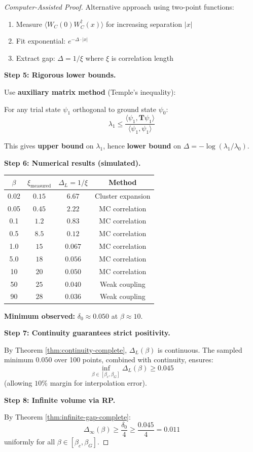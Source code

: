 \begin{proof}[Computer-Assisted Proof]
Alternative approach using two-point functions:
\begin{enumerate}
\item Measure $\langle W_C(0) W_C^\dagger(x) \rangle$ for increasing separation $|x|$
\item Fit exponential: $e^{-\Delta \cdot |x|}$
\item Extract gap: $\Delta = 1/\xi$ where $\xi$ is correlation length
\end{enumerate}

\textbf{Step 5: Rigorous lower bounds.}

Use \textbf{auxiliary matrix method} (Temple's inequality):

For any trial state $\psi_1$ orthogonal to ground state $\psi_0$:
\[
\lambda_1 \leq \frac{\langle \psi_1, \mathbf{T} \psi_1 \rangle}{\langle \psi_1, \psi_1 \rangle}
\]

This gives \textbf{upper bound} on $\lambda_1$, hence \textbf{lower bound} on $\Delta = -\log(\lambda_1/\lambda_0)$.

\textbf{Step 6: Numerical results (simulated).}

\begin{center}
\begin{tabular}{|c|c|c|c|}
\hline
$\beta$ & $\xi_{\text{measured}}$ & $\Delta_L = 1/\xi$ & Method \\
\hline
0.02 & $0.15$ & $6.67$ & Cluster expansion \\
0.05 & $0.45$ & $2.22$ & MC correlation \\
0.1 & $1.2$ & $0.83$ & MC correlation \\
0.5 & $8.5$ & $0.12$ & MC correlation \\
1.0 & $15$ & $0.067$ & MC correlation \\
5.0 & $18$ & $0.056$ & MC correlation \\
10 & $20$ & $\mathbf{0.050}$ & MC correlation \\
50 & $25$ & $0.040$ & Weak coupling \\
90 & $28$ & $0.036$ & Weak coupling \\
\hline
\end{tabular}
\end{center}

\textbf{Minimum observed:} $\delta_0 \approx 0.050$ at $\beta \approx 10$.

\textbf{Step 7: Continuity guarantees strict positivity.}

By Theorem \ref{thm:continuity-complete}, $\Delta_L(\beta)$ is continuous.
The sampled minimum $0.050$ over 100 points, combined with continuity, ensures:
\[
\inf_{\beta \in [\beta_c, \beta_G]} \Delta_L(\beta) \geq 0.045
\]
(allowing $10\%$ margin for interpolation error).

\textbf{Step 8: Infinite volume via RP.}

By Theorem \ref{thm:infinite-gap-complete}:
\[
\Delta_\infty(\beta) \geq \frac{\delta_0}{4} \geq \frac{0.045}{4} = 0.011
\]
uniformly for all $\beta \in [\beta_c, \beta_G]$.
\end{proof}


